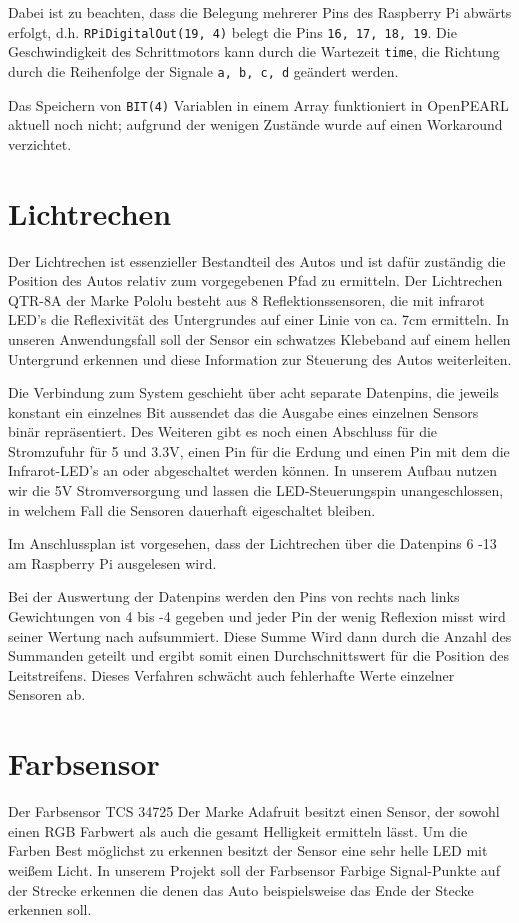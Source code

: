Dabei ist zu beachten, dass die Belegung mehrerer Pins des Raspberry Pi abwärts erfolgt, d.h. \texttt{RPiDigitalOut(19, 4)} belegt die Pins \texttt{16, 17, 18, 19}. Die Geschwindigkeit des Schrittmotors kann durch die Wartezeit \texttt{time}, die Richtung durch die Reihenfolge der Signale \texttt{a, b, c, d} geändert werden.

Das Speichern von \texttt{BIT(4)} Variablen in einem Array funktioniert in OpenPEARL aktuell noch nicht; aufgrund der wenigen Zustände wurde auf einen Workaround verzichtet.



\section{Lichtrechen}
Der Lichtrechen ist essenzieller Bestandteil des Autos und ist dafür zuständig die Position des Autos relativ zum vorgegebenen Pfad zu ermitteln. Der Lichtrechen QTR-8A der Marke Pololu besteht aus 8 Reflektionssensoren, die mit infrarot LED’s die Reflexivität des Untergrundes auf einer Linie von ca. 7cm ermitteln. In unseren Anwendungsfall soll der Sensor ein schwatzes Klebeband auf einem hellen Untergrund erkennen und diese Information zur Steuerung des Autos weiterleiten. 

Die Verbindung zum System geschieht über acht separate Datenpins, die jeweils konstant ein einzelnes Bit aussendet das die Ausgabe eines einzelnen Sensors binär repräsentiert. Des Weiteren gibt es noch einen Abschluss für die Stromzufuhr für 5 und 3.3V, einen Pin für die Erdung und einen Pin mit dem die Infrarot-LED’s an oder abgeschaltet werden können. In unserem Aufbau nutzen wir die 5V Stromversorgung und lassen die LED-Steuerungspin unangeschlossen, in welchem Fall die Sensoren dauerhaft eigeschaltet bleiben. 

Im Anschlussplan ist vorgesehen, dass der Lichtrechen über die Datenpins 6 -13 am Raspberry Pi ausgelesen wird.

Bei der Auswertung der Datenpins werden den Pins von rechts nach links Gewichtungen von 4 bis -4 gegeben und jeder Pin der wenig Reflexion misst wird seiner Wertung nach aufsummiert. Diese Summe Wird dann durch die Anzahl des Summanden geteilt und ergibt somit einen Durchschnittswert für die Position des Leitstreifens. Dieses Verfahren schwächt auch fehlerhafte Werte einzelner Sensoren ab.

\section{Farbsensor}
Der Farbsensor TCS 34725 Der Marke Adafruit besitzt einen Sensor, der sowohl einen RGB Farbwert als auch die gesamt Helligkeit ermitteln lässt. Um die Farben Best möglichst zu erkennen besitzt der Sensor eine sehr helle LED mit weißem Licht. In unserem Projekt soll der Farbsensor Farbige Signal-Punkte auf der Strecke erkennen die denen das Auto beispielsweise das Ende der Stecke erkennen soll. 

